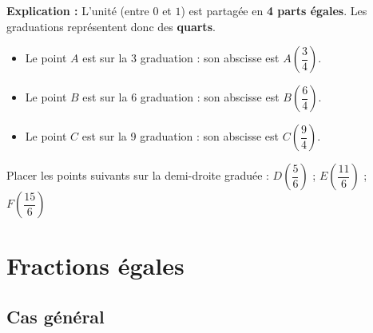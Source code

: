 \documentclass[a4paper]{book}
\begin{document}
\begin{exemple}
        \vspace{0.2cm}
        \textbf{Explication :} L'unité (entre $0$ et $1$) est partagée en \textbf{4 parts égales}. Les graduations représentent donc des \textbf{quarts}.
        \begin{itemize}
            \item Le point $A$ est sur la 3 graduation : son abscisse est \colorbox{cyan!10}{$A\left( \dfrac{3}{4} \right)$}.
            \item Le point $B$ est sur la 6 graduation : son abscisse est \colorbox{cyan!10}{$B\left( \dfrac{6}{4} \right)$}.
            \item Le point $C$ est sur la 9 graduation : son abscisse est \colorbox{cyan!10}{$C\left( \dfrac{9}{4} \right)$}.
        \end{itemize}
    \end{exemple}

    
    \begin{exemple}
        Placer les points suivants sur la demi-droite graduée : 
        \quad $D\left( \dfrac{5}{6} \right)$ \quad ; \quad $E\left( \dfrac{11}{6} \right)$ \quad ; \quad $F\left( \dfrac{15}{6} \right)$
        
        \begin{center}
        \end{center}
    \end{exemple}
    
    
\section{Fractions égales}
\subsection{Cas général}
    
\end{document}

